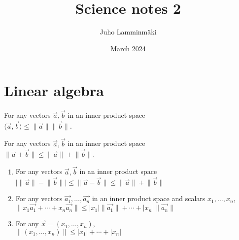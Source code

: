 \documentclass{article}
\title{Science notes 2}
\author{Juho Lamminmäki }
\date{March 2024}
\begin{document}
\maketitle

\section{Linear algebra}

\begin{theorem}
    For any vectors $\vec{a}, \vec{b}$ in an inner product space \\
    \begin{math}
        \langle \vec{a}, \vec{b} \rangle \leq \lVert \vec{a} \rVert \lVert \vec{b} \rVert.
    \end{math}
\end{theorem}

\begin{theorem}
    For any vectors $\vec{a}, \vec{b}$ in an inner product space \\
    \begin{math}
        \lVert \vec{a} + \vec{b} \rVert \leq  \lVert \vec{a} \rVert + \lVert \vec{b} \rVert.
    \end{math}
\end{theorem}
\begin{corollary}
    \begin{enumerate}
        \item For any vectors $\vec{a}, \vec{b}$ in an inner product space \\
              \begin{math}
                  \lvert \lVert \vec{a} \rVert - \lVert \vec{b} \rVert \rvert \leq \lVert \vec{a} - \vec{b} \rVert \leq \lVert \vec{a} \rVert + \lVert \vec{b} \rVert
              \end{math}
        \item For any vectors $\vec{a_1}, \ldots, \vec{a_n}$ in an inner product space and scalars $x_1, \ldots, x_n$, \\
              \begin{math}
                  \|x_1\vec{a_1} + \cdots + x_n\vec{a_n}\| \leq |x_1| \|\vec{a_1}\| + \cdots + |x_n|\|\vec{a_n}\|
              \end{math}
        \item For any $\vec{x} = (x_1, \ldots, x_n)$, \\
              \begin{math}
                  \|(x_1, \ldots, x_n)\| \leq |x_1| + \cdots + |x_n|
              \end{math}


    \end{enumerate}
\end{corollary}
\end{document}
